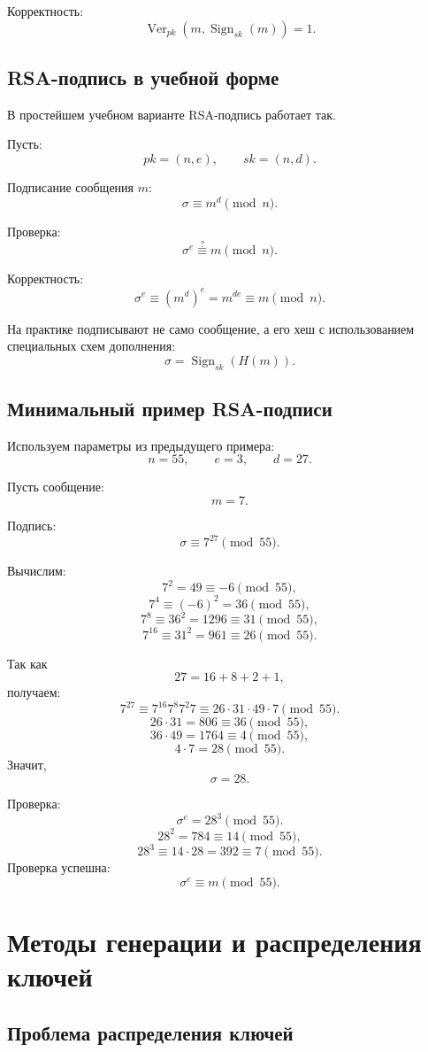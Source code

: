 \documentclass[12pt,a4paper]{article}
\DeclareMathOperator{\Sign}{Sign}
\DeclareMathOperator{\Ver}{Ver}
\begin{document}
Корректность:
\[
    \Ver_{pk}(m,\Sign_{sk}(m))=1.
\]

\subsection{RSA-подпись в учебной форме}

В простейшем учебном варианте RSA-подпись работает так.

Пусть:
\[
    pk=(n,e),\qquad sk=(n,d).
\]

Подписание сообщения $m$:
\[
    \sigma \equiv m^d \pmod n.
\]

Проверка:
\[
    \sigma^e \stackrel{?}{\equiv} m \pmod n.
\]

Корректность:
\[
    \sigma^e\equiv (m^d)^e=m^{de}\equiv m \pmod n.
\]

На практике подписывают не само сообщение, а его хеш с использованием специальных схем дополнения:
\[
    \sigma = \Sign_{sk}(H(m)).
\]

\subsection{Минимальный пример RSA-подписи}

Используем параметры из предыдущего примера:
\[
    n=55,\qquad e=3,\qquad d=27.
\]

Пусть сообщение:
\[
    m=7.
\]

Подпись:
\[
    \sigma \equiv 7^{27}\pmod{55}.
\]

Вычислим:
\[
    7^2=49\equiv -6 \pmod{55},
\]
\[
    7^4\equiv (-6)^2=36 \pmod{55},
\]
\[
    7^8\equiv 36^2=1296\equiv 31 \pmod{55},
\]
\[
    7^{16}\equiv 31^2=961\equiv 26 \pmod{55}.
\]

Так как
\[
    27=16+8+2+1,
\]
получаем:
\[
    7^{27}\equiv 7^{16}7^8 7^2 7
    \equiv 26\cdot 31\cdot 49\cdot 7 \pmod{55}.
\]
\[
    26\cdot 31=806\equiv 36 \pmod{55},
\]
\[
    36\cdot 49=1764\equiv 4 \pmod{55},
\]
\[
    4\cdot 7=28 \pmod{55}.
\]
Значит,
\[
    \sigma=28.
\]

Проверка:
\[
    \sigma^e=28^3\pmod{55}.
\]
\[
    28^2=784\equiv 14 \pmod{55},
\]
\[
    28^3\equiv 14\cdot 28=392\equiv 7 \pmod{55}.
\]
Проверка успешна:
\[
    \sigma^e\equiv m \pmod{55}.
\]

\section{Методы генерации и распределения ключей}

\subsection{Проблема распределения ключей}
\end{document}
